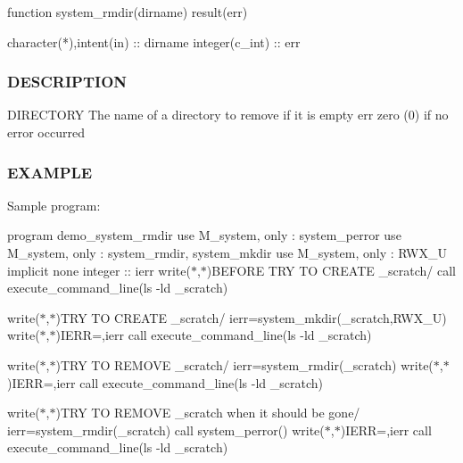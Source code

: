 \begin{DoxyVerb}function system_rmdir(dirname) result(err)

 character(*),intent(in) :: dirname
 integer(c_int) :: err
\end{DoxyVerb}


\subsubsection*{D\+E\+S\+C\+R\+I\+P\+T\+I\+ON}

D\+I\+R\+E\+C\+T\+O\+RY The name of a directory to remove if it is empty err zero (0) if no error occurred

\subsubsection*{E\+X\+A\+M\+P\+LE}

Sample program\+:

program demo\+\_\+system\+\_\+rmdir use M\+\_\+system, only \+: system\+\_\+perror use M\+\_\+system, only \+: system\+\_\+rmdir, system\+\_\+mkdir use M\+\_\+system, only \+: R\+W\+X\+\_\+U implicit none integer \+:\+: ierr write($\ast$,$\ast$)\textquotesingle{}B\+E\+F\+O\+RE T\+RY TO C\+R\+E\+A\+TE \+\_\+scratch/\textquotesingle{} call execute\+\_\+command\+\_\+line(\textquotesingle{}ls -\/ld \+\_\+scratch\textquotesingle{})

write($\ast$,$\ast$)\textquotesingle{}T\+RY TO C\+R\+E\+A\+TE \+\_\+scratch/\textquotesingle{} ierr=system\+\_\+mkdir(\textquotesingle{}\+\_\+scratch\textquotesingle{},R\+W\+X\+\_\+U) write($\ast$,$\ast$)\textquotesingle{}I\+E\+RR=\textquotesingle{},ierr call execute\+\_\+command\+\_\+line(\textquotesingle{}ls -\/ld \+\_\+scratch\textquotesingle{})

write($\ast$,$\ast$)\textquotesingle{}T\+RY TO R\+E\+M\+O\+VE \+\_\+scratch/\textquotesingle{} ierr=system\+\_\+rmdir(\textquotesingle{}\+\_\+scratch\textquotesingle{}) write($\ast$,$\ast$)\textquotesingle{}I\+E\+RR=\textquotesingle{},ierr call execute\+\_\+command\+\_\+line(\textquotesingle{}ls -\/ld \+\_\+scratch\textquotesingle{})

write($\ast$,$\ast$)\textquotesingle{}T\+RY TO R\+E\+M\+O\+VE \+\_\+scratch when it should be gone/\textquotesingle{} ierr=system\+\_\+rmdir(\textquotesingle{}\+\_\+scratch\textquotesingle{}) call system\+\_\+perror(\textquotesingle{}) write($\ast$,$\ast$)\textquotesingle{}I\+E\+RR=\textquotesingle{},ierr call execute\+\_\+command\+\_\+line(\textquotesingle{}ls -\/ld \+\_\+scratch\textquotesingle{})

